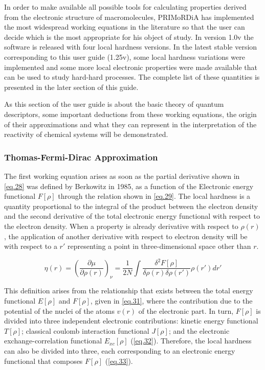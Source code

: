 \documentclass[a4paper,11pt]{refart}
\begin{document}
	In order to make available all possible tools for calculating properties derived from the electronic structure of macromolecules, PRIMoRDiA has implemented the most widespread working equations in the literature so that the user can decide which is the most appropriate for his object of study. In version 1.0v the software is released with four local hardness versions. In the latest stable version corresponding to this user guide (1.25v), some local hardness variations were implemented and some more local electronic properties were made available that can be used to study hard-hard processes. The complete list of these quantities is presented in the later section of this guide.

	As this section of the user guide is about the basic theory of quantum descriptors, some important deductions from these working equations, the origin of their approximations and what they can represent in the interpretation of the reactivity of chemical systems will be demonstrated.

	\subsubsection{Thomas-Fermi-Dirac Approximation}

	The first working equation arises as soon as the partial derivative shown in \autoref{eq.28} was defined by Berkowitz in 1985\cite{berkowitz1985concept}, as a function of the Electronic energy functional $F[\rho]$ through the relation shown in \autoref{eq.29}. The local hardness is a quantity proportional to the integral of the product between the electron density and the second derivative of the total electronic energy functional with respect to the electron density. When a property is already derivative with respect to $\rho(r)$, the application of another derivative with respect to electron density will be with respect to a $r'$ representing a point in three-dimensional space other than $r $.

	\begin{equation}
	\eta(r) = \left( \frac{\partial \mu}{\partial \rho(r) } \right)_\nu = \frac{1}{2N} \int \frac{\delta^2 F[\rho]}{\delta \rho(r) \delta \rho(r')} \rho(r')dr'
	\label{eq.30}
	\end{equation}

	This definition arises from the relationship that exists between the total energy functional $E[\rho]$ and $F[\rho]$, given in \autoref{eq.31}, where the contribution due to the potential of the nuclei of the atoms $v(r)$ of the electronic part. In turn, $F[\rho]$ is divided into three independent electronic contributions: kinetic energy functional $T[\rho]$; classical coulomb interaction functional $J[\rho]$; and the electronic exchange-correlation functional $E_{xc}[\rho]$ (\autoref{eq.32}). Therefore, the local hardness can also be divided into three, each corresponding to an electronic energy functional that composes $F[\rho]$ (\autoref{eq.33}).
\end{document}
